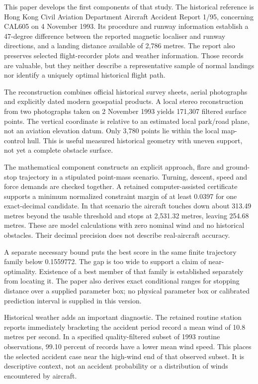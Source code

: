 \documentclass[11pt,a4paper]{article}
\begin{document}
This paper develops the first components of that study. The historical reference is Hong Kong Civil Aviation Department Aircraft Accident Report 1/95, concerning CAL605 on 4 November 1993. Its procedure and runway information establish a 47-degree difference between the reported magnetic localiser and runway directions, and a landing distance available of 2,786 metres. The report also preserves selected flight-recorder plots and weather information. Those records are valuable, but they neither describe a representative sample of normal landings nor identify a uniquely optimal historical flight path.

The reconstruction combines official historical survey sheets, aerial photographs and explicitly dated modern geospatial products. A local stereo reconstruction from two photographs taken on 2 November 1993 yields 171,307 filtered surface points. The vertical coordinate is relative to an estimated local park/road plane, not an aviation elevation datum. Only 3,780 points lie within the local map-control hull. This is useful measured historical geometry with uneven support, not yet a complete obstacle surface.

The mathematical component constructs an explicit approach, flare and ground-stop trajectory in a stipulated point-mass scenario. Turning, descent, speed and force demands are checked together. A retained computer-assisted certificate supports a minimum normalized constraint margin of at least 0.0397 for one exact-decimal candidate. In that scenario the aircraft touches down about 313.49 metres beyond the usable threshold and stops at 2,531.32 metres, leaving 254.68 metres. These are model calculations with zero nominal wind and no historical obstacles. Their decimal precision does not describe real-aircraft accuracy.

A separate necessary bound puts the best score in the same finite trajectory family below 0.1559772. The gap is too wide to support a claim of near-optimality. Existence of a best member of that family is established separately from locating it. The paper also derives exact conditional ranges for stopping distance over a supplied parameter box; no physical parameter box or calibrated prediction interval is supplied in this version.

Historical weather adds an important diagnostic. The retained routine station reports immediately bracketing the accident period record a mean wind of 10.8 metres per second. In a specified quality-filtered subset of 1993 routine observations, 99.10 percent of records have a lower mean wind speed. This places the selected accident case near the high-wind end of that observed subset. It is descriptive context, not an accident probability or a distribution of winds encountered by aircraft.
\end{document}
